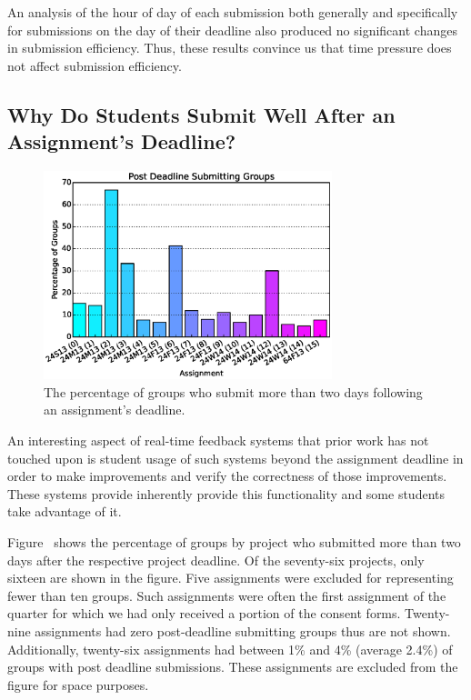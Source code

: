 An analysis of the hour of day of each submission both generally and
specifically for submissions on the day of their deadline also produced no
significant changes in submission efficiency. Thus, these results convince us
that time pressure does not affect submission efficiency.

\subsection{Why Do Students Submit Well After an Assignment's Deadline?}

\begin{figure}[!t]
\centering \includegraphics[width=3.3in]{graphs/Post_Deadline_Submitting_Groups.eps}
\caption{The percentage of groups who submit more than two days following an
  assignment's deadline.}
\end{figure}

An interesting aspect of real-time feedback systems that prior work has not
touched upon is student usage of such systems beyond the assignment deadline in
order to make improvements and verify the correctness of those
improvements. These systems provide inherently provide this functionality and
some students take advantage of it.

Figure~ shows the percentage of groups by project who
submitted more than two days after the respective project deadline. Of the
seventy-six projects, only sixteen are shown in the figure. Five assignments
were excluded for representing fewer than ten groups. Such assignments were
often the first assignment of the quarter for which we had only received a
portion of the consent forms. Twenty-nine assignments had zero post-deadline
submitting groups thus are not shown. Additionally, twenty-six assignments had
between 1\% and 4\% (average 2.4\%) of groups with post deadline
submissions. These assignments are excluded from the figure for space purposes.

